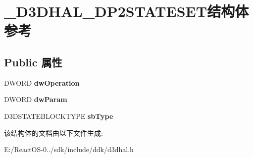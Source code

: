 \hypertarget{struct___d3_d_h_a_l___d_p2_s_t_a_t_e_s_e_t}{}\section{\+\_\+\+D3\+D\+H\+A\+L\+\_\+\+D\+P2\+S\+T\+A\+T\+E\+S\+E\+T结构体 参考}
\label{struct___d3_d_h_a_l___d_p2_s_t_a_t_e_s_e_t}
\subsection*{Public 属性}
\begin{DoxyCompactItemize}
\item 
\mbox{\label{struct___d3_d_h_a_l___d_p2_s_t_a_t_e_s_e_t_a55520413a6f9d0c4a5c4a6e5c4537ad3}} 
D\+W\+O\+RD {\bfseries dw\+Operation}
\item 
\mbox{\label{struct___d3_d_h_a_l___d_p2_s_t_a_t_e_s_e_t_a8b81258480696abb5faf13fe43657ddc}} 
D\+W\+O\+RD {\bfseries dw\+Param}
\item 
\mbox{\label{struct___d3_d_h_a_l___d_p2_s_t_a_t_e_s_e_t_a09acaa6dc2a25cd04b737dcecb5bebf1}} 
D3\+D\+S\+T\+A\+T\+E\+B\+L\+O\+C\+K\+T\+Y\+PE {\bfseries sb\+Type}
\end{DoxyCompactItemize}


该结构体的文档由以下文件生成\+:\begin{DoxyCompactItemize}
\item 
E\+:/\+React\+O\+S-\/0../sdk/include/ddk/d3dhal.\+h\end{DoxyCompactItemize}
